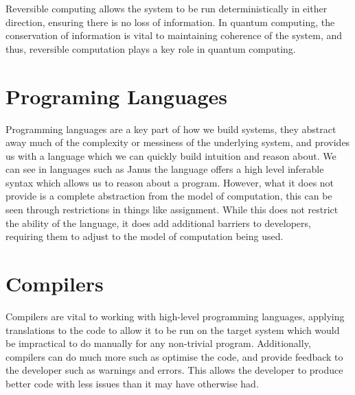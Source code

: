 Reversible computing allows the system to be run deterministically in either direction, ensuring there is no loss of information.
In quantum computing, the conservation of information is vital to maintaining coherence of the system, and thus, reversible computation plays a key role in quantum computing.

\section{Programing Languages}\label{sec:programing-languages}
Programming languages are a key part of how we build systems, they abstract away much of the complexity or messiness of the underlying system, and provides us with a language which we can quickly build intuition and reason about.
We can see in languages such as Janus\cite{JanusLetter} the language offers a high level inferable syntax which allows us to reason about a program.
However, what it does not provide is a complete abstraction from the model of computation, this can be seen through restrictions in things like assignment.
While this does not restrict the ability of the language, it does add additional barriers to developers, requiring them to adjust to the model of computation being used.

\section{Compilers}\label{sec:compilers}
Compilers are vital to working with high-level programming languages, applying translations to the code to allow it to be run on the target system which would be impractical to do manually for any non-trivial program.
Additionally, compilers can do much more such as optimise the code, and provide feedback to the developer such as warnings and errors.
This allows the developer to produce better code with less issues than it may have otherwise had.


